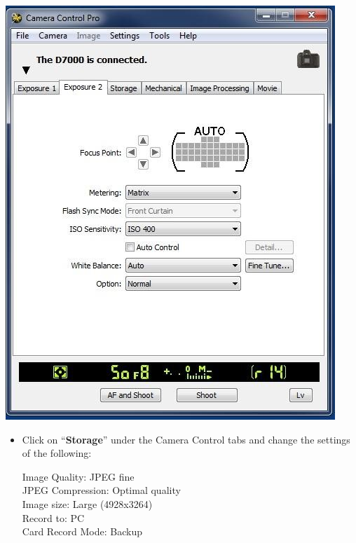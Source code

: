\documentclass[]{book}
\begin{document}
\includegraphics{images/Camera4.jpg}

\begin{itemize}
\item
  Click on ``\textbf{Storage}'' under the Camera Control tabs and change the settings of the following:

  Image Quality: JPEG fine\\
  JPEG Compression: Optimal quality\\
  Image size: Large (4928x3264)\\
  Record to: PC\\
  Card Record Mode: Backup
\end{itemize}
\end{document}
